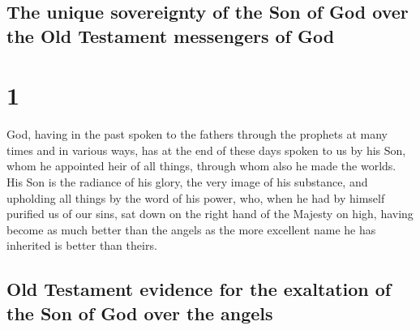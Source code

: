 \hypertarget{the-unique-sovereignty-of-the-son-of-god-over-the-old-testament-messengers-of-god}{%
\subsection{The unique sovereignty of the Son of God over the Old
Testament messengers of
God}\label{the-unique-sovereignty-of-the-son-of-god-over-the-old-testament-messengers-of-god}}

\hypertarget{section}{%
\section{1}\label{section}}

 God, having in the past spoken to the fathers through the
prophets at many times and in various ways,  has at the
end of these days spoken to us by his Son, whom he appointed heir of all
things, through whom also he made the worlds.  His Son is
the radiance of his glory, the very image of his substance, and
upholding all things by the word of his power, who, when he had by
himself purified us of our sins, sat down on the right hand of the
Majesty on high,  having become as much better than the
angels as the more excellent name he has inherited is better than
theirs.

\hypertarget{old-testament-evidence-for-the-exaltation-of-the-son-of-god-over-the-angels}{%
\subsection{Old Testament evidence for the exaltation of the Son of God
over the
angels}\label{old-testament-evidence-for-the-exaltation-of-the-son-of-god-over-the-angels}}

